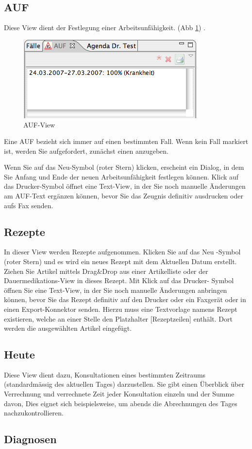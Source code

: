 \subsection{AUF}
Diese View dient der Festlegung einer Arbeitsunfähigkeit. (Abb \ref{fig:auf})
 . %
\begin{figure}[htp]
\begin{center}
  \includegraphics{images/aufview}
  \caption{AUF-View}
  \label{fig:auf}
\end{center}
\end{figure}
Eine AUF bezieht sich immer auf einen bestimmten Fall. Wenn kein Fall markiert
ist, werden Sie aufgefordert, zunächst einen anzugeben.

Wenn Sie auf das \glqq Neu\grqq -Symbol (roter Stern) klicken, erscheint ein
Dialog, in dem Sie Anfang und Ende der neuen Arbeitsunfähigkeit festlegen
können. Klick auf das \glqq Drucker\grqq -Symbol öffnet eine Text-View, in der
Sie noch manuelle Änderungen am AUF-Text ergänzen können, bevor Sie das Zeugnis
definitiv ausdrucken oder aufs Fax senden.

\subsection{Rezepte}
In dieser View werden Rezepte aufgenommen. Klicken Sie auf das \glqq Neu\grqq
-Symbol (roter Stern) und es wird ein neues Rezept mit dem Aktuellen Datum
erstellt. Ziehen Sie Artikel mittels Drag\&Drop aus einer Artikelliste oder der
Dauermedikations-View in dieses Rezept. Mit Klick auf das \glqq Drucker\grqq -
Symbol öffnen Sie eine Text-View, in der Sie noch manuelle Änderungen anbringen
können, bevor Sie das Rezept definitiv auf den Drucker oder ein Faxgerät oder in
einen Export-Konnektor senden.
Hierzu muss eine Textvorlage namens \glqq Rezept\grqq
existieren, welche an einer Stelle den Platzhalter [Rezeptzeilen] enthält. Dort
werden die ausgewählten Artikel eingefügt.

\subsection{Heute}
Diese View dient dazu, Konsultationen eines bestimmten Zeitraums (standardmässig
des aktuellen Tages) darzustellen. Sie gibt einen Überblick über Verrechnung und
verrechnete Zeit jeder Konsultation einzeln und der Summe davon, Dies eignet
sich beispielsweise, um abends die Abrechnungen des Tages nachzukontrollieren.


\subsection{Diagnosen}

